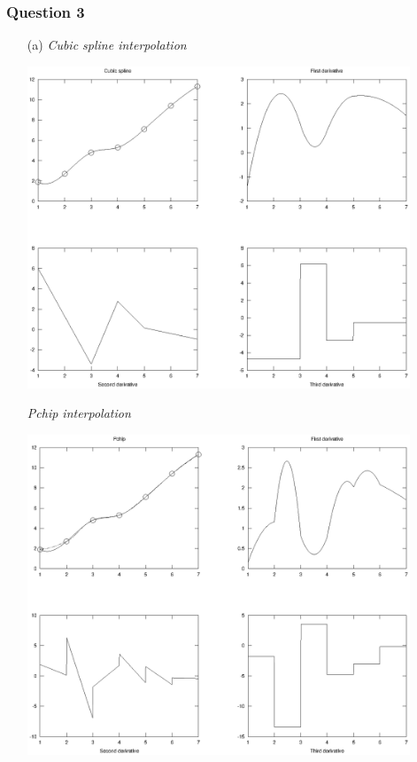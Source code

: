 \documentclass[11pt,a4paper]{article}
\begin{document}
\pagebreak

\subsubsection*{Question 3}
\begin{enumerate}
	\item[(a)] \textit{Cubic spline interpolation}
	\begin{center}
		\includegraphics[width=0.9\textwidth]{q3cs.eps}
	\end{center}
	
	\textit{Pchip interpolation}
	\begin{center}
		\includegraphics[width=0.9\textwidth]{q3pc.eps}
	\end{center}
	

\end{enumerate}
\end{document}
